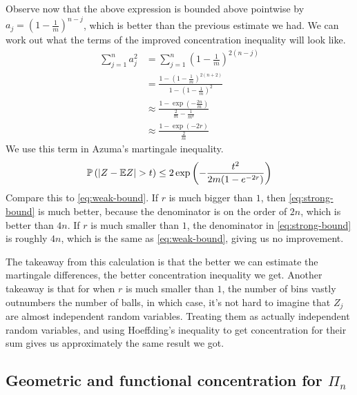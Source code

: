 \documentclass[11pt]{article}
\begin{document}
Observe now that the above expression is bounded above pointwise by $a_j = \left( 1- \frac{1}{m} \right)^{n-j}$, which is better than the previous estimate we had.
We can work out what the terms of the improved concentration inequality will look like.
\begin{align*}
  \sum_{j=1}^{n} a_j^2 &= \sum_{j=1}^n \left( 1 - \frac{1}{m} \right)^{2(n-j)} \\
                       &=\frac{1 - \left( 1- \frac{1}{m} \right)^{2(n+2)}}{1- \left( 1 - \frac{1}{m} \right)^2} \\
                       &\approx \frac{ 1 - \exp\left( - \frac{2n}{m} \right)}{\frac{2}{m} - \frac{1}{m^2}} \\
  &\approx \frac{1 - \exp(-2r)}{\frac{2}{m}}
\end{align*}
We use this term in Azuma's martingale inequality.
\begin{align}
  \label{eq:strong-bound}
  \mathbb{P}\left( \left| Z - \mathbb{E} Z \right| > t \right) \leq 2 \exp \left( - \frac{t^2}{2m(1-e^{-2r})} \right)
\end{align}
Compare this to \eqref{eq:weak-bound}.
If $r$ is much bigger than $1$, then \eqref{eq:strong-bound} is much better, because the denominator is on the order of $2n$, which is better than $4n$.
If $r$ is much smaller than $1$, the denominator in \eqref{eq:strong-bound} is roughly $4n$, which is the same as \eqref{eq:weak-bound}, giving us no improvement.

The takeaway from this calculation is that the better we can estimate the martingale differences, the better concentration inequality we get.
Another takeaway is that for when $r$ is much smaller than $1$, the number of bins vastly outnumbers the number of balls, in which case, it's not hard to imagine that $Z_j$ are almost independent random variables.
Treating them as actually independent random variables, and using Hoeffding's inequality to get concentration for their sum gives us approximately the same result we got.

\subsection{Geometric and functional concentration for $\Pi_n$}
\label{sec:geom-funct-conc}
\end{document}
